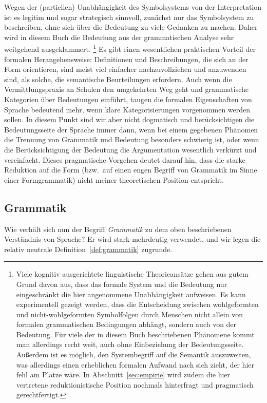 Wegen der (partiellen) Unabhängigkeit des Symbolsystems von der Interpretation ist es legitim und sogar strategisch sinnvoll, zunächst nur das Symbolsystem zu beschreiben, ohne sich über die Bedeutung zu viele Gedanken zu machen.
Daher wird in diesem Buch die Bedeutung aus der grammatischen Analyse sehr weitgehend ausgeklammert.%
\footnote{Viele kognitiv ausgerichtete linguistische Theorieansätze gehen aus gutem Grund davon aus, dass das formale System und die Bedeutung nur eingeschränkt die hier angenommene Unabhängigkeit aufweisen.
Es kann \zB experimentell gezeigt werden, dass die Entscheidung zwischen wohlgeformten und nicht-wohlgeformten Symbolfolgen durch Menschen nicht allein von formalen grammatischen Bedingungen abhängt, sondern auch von der Bedeutung.
Für viele der in diesem Buch beschriebenen Phänomene kommt man allerdings recht weit, auch ohne Einbeziehung der Bedeutungsseite.
Außerdem ist es möglich, den Systembegriff auf die Semantik auszuweiten, was allerdings einen erheblichen formalen Aufwand nach sich zieht, der hier fehl am Platze wäre.
In Abschnitt~\ref{sec:empirie} wird zudem die hier vertretene reduktionistische Position nochmals hinterfragt und pragmatisch gerechtfertigt.}
Es gibt einen wesentlichen praktischen Vorteil der formalen Herangehensweise:
Definitionen und Beschreibungen, die sich an der Form orientieren, sind meist viel einfacher nachzuvollziehen und anzuwenden sind, als solche, die semantische Beurteilungen erfordern.
Auch wenn die Vermittlungspraxis an Schulen \idR den umgekehrten Weg geht und grammatische Kategorien über Bedeutungen einführt, taugen die formalen Eigenschaften von Sprache bedeutend mehr, wenn klare Kategorisierungen vorgenommen werden sollen.
In diesem Punkt sind wir aber nicht dogmatisch und berücksichtigen die Bedeutungsseite der Sprache immer dann, wenn bei einem gegebenen Phänomen die Trennung von Grammatik und Bedeutung besonders schwierig ist, oder wenn die Berücksichtigung der Bedeutung die Argumentation wesentlich verkürzt und vereinfacht.
Dieses pragmatische Vorgehen deutet darauf hin, dass die starke Reduktion auf die Form (bzw.\ auf einen engen Begriff von Grammatik im Sinne einer Formgrammatik) nicht meiner theoretischen Position entspricht.

\subsection{Grammatik}

\label{sec:grammatikbegriff}

Wie verhält sich nun der Begriff \textit{Grammatik} zu dem oben beschriebenen Verständnis von Sprache?
Er wird stark mehrdeutig verwendet, und wir legen die relativ neutrale Definition~\ref{def:grammatik} zugrunde.

